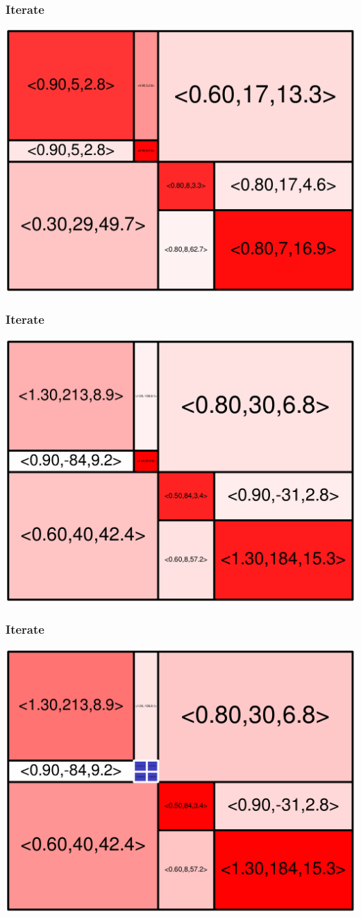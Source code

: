 \begin{frame}
\frametitle{Iterate}\begin{centering}\includegraphics[width=8.5 cm]{remy-graph/graph/test9.pdf}

\end{centering}\end{frame}


\begin{frame}
\frametitle{Iterate}\begin{centering}\includegraphics[width=8.5 cm]{remy-graph/graph/test10.pdf}

\end{centering}\end{frame}


\begin{frame}
\frametitle{Iterate}\begin{centering}\includegraphics[width=8.5 cm]{remy-graph/graph/test11.pdf}

\end{centering}\end{frame}


